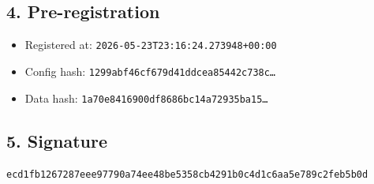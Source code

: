 \documentclass{article}
\begin{document}
\subsection*{4. Pre-registration}
\begin{itemize}
\item Registered at: \texttt{2026-05-23T23:16:24.273948+00:00}
\item Config hash: \texttt{1299abf46cf679d41ddcea85442c738c\dots}
\item Data hash: \texttt{1a70e8416900df8686bc14a72935ba15\dots}
\end{itemize}
\subsection*{5. Signature}
\texttt{ecd1fb1267287eee97790a74ee48be5358cb4291b0c4d1c6aa5e789c2feb5b0d}\\
\end{document}
